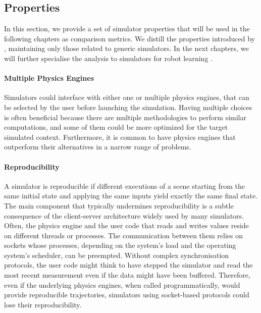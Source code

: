 \subsection{Properties}
\label{sec:simulator_properties}

In this section, we provide a set of simulator properties that will be used in the following chapters as comparison metrics.
We distill the properties introduced by \textcite{ferigo_gym-ignition_2020}, maintaining only those related to generic simulators.
In the next chapters, we will further specialise the analysis to simulators for robot learning .

\paragraph{Multiple Physics Engines}

Simulators could interface with either one or multiple physics engines, that can be selected by the user before launching the simulation.
Having multiple choices is often beneficial because there are multiple methodologies to perform similar computations, and some of them could be more optimized for the target simulated context.
Furthermore, it is common to have physics engines that outperform their alternatives in a narrow range of problems.

\paragraph{Reproducibility}

A simulator is reproducible if different executions of a scene starting from the same initial state and applying the same inputs yield exactly the same final state.
The main component that typically undermines reproducibility is a subtle consequence of the client-server architecture widely used by many simulators.
Often, the physics engine and the user code that reads and writes values reside on different threads or processes.
The communication between them relies on sockets
whose processes, depending on the system's load and  the operating system's scheduler, can be preempted.
Without complex synchronisation protocols, the user code might think to have stepped the simulator and read the most recent measurement even if the data might have been buffered.
Therefore, even if the underlying physics engines, when called programmatically, would provide reproducible trajectories, simulators using socket-based protocols could lose their reproducibility.

